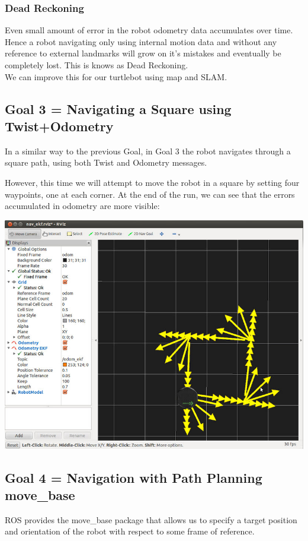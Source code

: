 \documentclass[10pt,a4paper]{article}
\begin{document}
\subsubsection{Dead Reckoning}
Even small amount of error in the robot odometry data accumulates over time. Hence a robot navigating only using internal motion data and without any reference to external landmarks will grow on it's mistakes and eventually be completely lost. This is knows as Dead Reckoning. \\
We can improve this for our turtlebot using map and SLAM.

\subsection{Goal 3 = Navigating a Square using Twist+Odometry}
In a similar way to the previous Goal, in Goal 3 the robot navigates through a square path, using both Twist and Odometry messages.

However, this time we will attempt to move the robot in a square by setting four waypoints, one at each corner. At the end of the run, we can see that the errors accumulated in odometry are more visible:

\begin{center}
\includegraphics[width=\textwidth]{images/square_py.jpg}\\
\end{center}

\subsection{Goal 4 = Navigation with Path Planning move\_base}
ROS provides the move\_base package that allows us to specify a target position and orientation of the robot with respect to some frame of reference.
\end{document}
